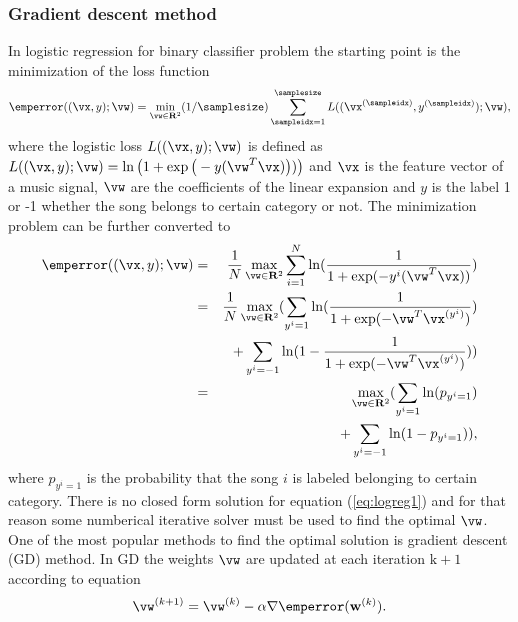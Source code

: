 \documentclass[aps,prb,10pt,twocolumn,groupedaddress]{revtex4-1}
\begin{document}
\subsubsection{Gradient descent method}
\label{sec:gradient_descent}
In logistic regression for binary classifier problem the starting point is the
minimization of the loss function
\vspace*{-2mm}
 $$\emperror((\vx,y);\vw) =\min\limits_{\vw \in \mathbf{R}^{2}} (1/\samplesize)\sum_{\sampleidx=1}^{\samplesize} L((\vx^{(\sampleidx)},y^{(\sampleidx)}); \vw),$$
where the logistic loss $L((\vx,y); \vw)$ is defined as   $L((\vx,y); \vw) = \ln\big(1 + \exp\big(- y (\vw^{T} \vx)\big))\big)$ and
$\vx$ is the feature vector of a music signal, $\vw$ are the coefficients of the linear expansion and $y$ is the label 1 or -1 whether the
song belongs to certain category or not. The minimization problem can be further converted to
\begin{eqnarray}
  \emperror((\vx,y);\vw)&=&\frac{1}{N}\max\limits_{\vw \in \mathbf{R}^{2}}\sum_{i=1}^{N}\mathrm{ln}(\frac{1}{1+\mathrm{exp}(-y^i(\vw^T\vx))})\nonumber\\
  &=&\frac{1}{N}\max\limits_{\vw \in \mathbf{R}^{2}}(\sum_{y^i=1}\mathrm{ln}(\frac{1}{1+\mathrm{exp}(-\vw^T\vx^{(y^i)})})\nonumber\\
  & & + \sum_{y^i=-1}\mathrm{ln}(1-\frac{1}{1 + \mathrm{exp}(-\vw^T\vx^{(y^i)})}))\\
  &=&\max\limits_{\vw \in \mathbf{R}^{2}}(\sum_{y^i=1}\mathrm{ln}(p_{y^i=1})\nonumber\\
  & & + \sum_{y^i=-1}\mathrm{ln}(1-p_{y^i=1})),
  \label{eq:logreg1}
\end{eqnarray}
where $p_{y^i=1}$ is the probability that the song $i$ is labeled belonging to certain category.
There is no closed form solution for equation (\ref{eq:logreg1}) and for that reason some numberical iterative solver must
be used to find the optimal $\vw$. One of the most popular methods to find the optimal solution is gradient descent (GD) method.
In GD the weights $\vw$ are updated at each iteration $\mathrm{k+1}$ according to equation
\begin{equation}
  \vw^{(k+1)} = \vw^{(k)} - \alpha \nabla \emperror(\mathbf{w}^{(k)}).
  \label{eq:gd}
\end{equation}
\end{document}
